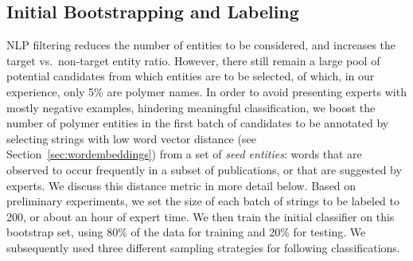 \subsection{Initial Bootstrapping and Labeling}\label{sec:initial}
NLP filtering reduces the number of entities to be considered, and increases the target vs.\ non-target entity ratio.
However, there still remain a large pool of potential candidates from which entities are to be selected,
of which, in our experience, only 5\% are polymer names.
In order to avoid presenting experts with mostly negative examples, hindering meaningful classification,
we boost the number of polymer entities in the first batch of candidates to be annotated by
selecting strings with low word vector distance (see Section~\ref{sec:wordembeddings}) from
a set of \emph{seed entities}:
words that are observed to occur frequently  
in a subset of publications, or that are suggested by experts.
We discuss this distance metric in more detail below.
Based on preliminary experiments, we set the size of each batch of strings to be labeled to 200, 
or about an hour of expert time.
We then train the initial classifier on this bootstrap set, using 80\% of the data for training and 20\% for testing.
We subsequently used three different sampling strategies for following classifications.



